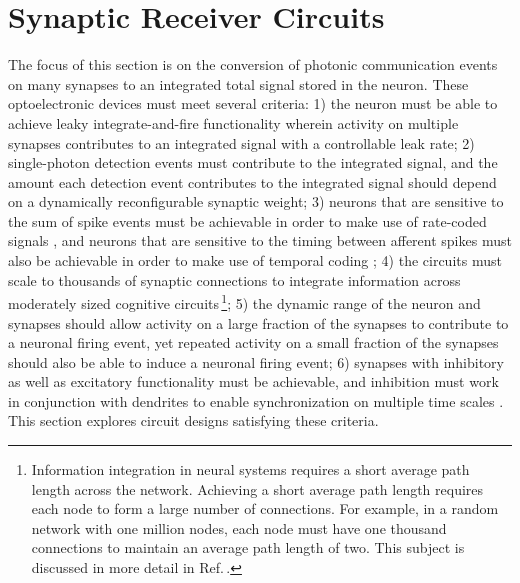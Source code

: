 \documentclass[aip,amsmath,amssymb,reprint,nofootinbib]{revtex4-1}
\begin{document}
\section{\label{sec:receiverCircuits}Synaptic Receiver Circuits}
The focus of this section is on the conversion of photonic communication events on many synapses to an integrated total signal stored in the neuron. These optoelectronic devices must meet several criteria: 1) the neuron must be able to achieve leaky integrate-and-fire functionality \cite{daab2001,geki2002} wherein activity on multiple synapses contributes to an integrated signal with a controllable leak rate; 2) single-photon detection events must contribute to the integrated signal, and the amount each detection event contributes to the integrated signal should depend on a dynamically reconfigurable synaptic weight; 3) neurons that are sensitive to the sum of spike events must be achievable in order to make use of rate-coded signals \cite{st1967}, and neurons that are sensitive to the timing between afferent spikes must also be achievable in order to make use of temporal coding \cite{thde2001,geki2002,sase2001,stgo2005}; 4) the circuits must scale to thousands of synaptic connections to integrate information across moderately sized cognitive circuits\,\footnote{Information integration in neural systems requires a short average path length across the network. Achieving a short average path length requires each node to form a large number of connections. For example, in a random network with one million nodes, each node must have one thousand connections to maintain an average path length of two. This subject is discussed in more detail in Ref.\,.}; 5) the dynamic range of the neuron and synapses should allow activity on a large fraction of the synapses to contribute to a neuronal firing event, yet repeated activity on a small fraction of the synapses should also be able to induce a neuronal firing event; 6) synapses with inhibitory as well as excitatory functionality must be achievable, and inhibition must work in conjunction with dendrites \cite{budr2004,bu2006,haah2015} to enable synchronization on multiple time scales \cite{sase2001,enfr2001,vala2001,budr2004,robu2015}. This section explores circuit designs satisfying these criteria. 
	
\end{document}
